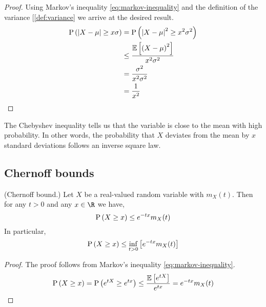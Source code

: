 \documentclass[11pt]{article}
\newcommand{\boxref}[1]{[\ref{#1}}
\begin{document}
\begin{proof}
    Using Markov's inequality \eqref{eq:markov-inequality} and the definition
    of the variance \boxref{def:variance} we arrive at the desired result.
    \begin{align*}
        \operatorname{P}{\left(\left\lvert X - \mu\right\rvert \geq x \sigma\right)}
        & = \operatorname{P}{\left(\left\lvert X - \mu\right\rvert^2 \geq x^2 \sigma^2\right)} \\
        & \leq \frac{\operatorname{\mathbb{E}}{\left[\left(X - \mu\right)^2\right]}}{x^2 \sigma^2} \\
        & = \frac{\sigma^2}{x^2 \sigma^2} \\
        & = \frac{1}{x^2}
    \end{align*}
\end{proof}

\begin{rem}
    The Chebyshev inequality tells us that the variable is close to the mean
    with high probability.
    In other words, the probability that $X$ deviates from the mean by $x$
    standard deviations follows an inverse square law.
\end{rem}

\subsection{Chernoff bounds}

\begin{thm}{(Chernoff bound.)}
    \label{thm:chernoff-bound}
    Let $X$ be a real-valued random variable with \mgf{} $m_X(t)$.
    Then for any $t > 0$ and any $x \in \R$ we have,
    \begin{equation}
        \label{eq:chernoff-bound}
        \P{X \geq x} \leq e^{-tx} m_X(t)
    \end{equation}
    In particular,
    \begin{equation}
        \label{eq:chernoff-bound-inf}
        \P{X \geq x} \leq \inf_{t>0} \bracks{e^{-tx} m_X(t)}
    \end{equation}
\end{thm}

\begin{proof}
    The proof follows from Markov's inequality \eqref{eq:markov-inequality}.
    \begin{align*}
        \operatorname{P}{\left(X \geq x\right)}
        =
        \operatorname{P}{\left(e^{tX} \geq e^{tx}\right)}
        \leq
        \frac{\operatorname{\mathbb{E}}{\left[e^{tX}\right]}}{e^{tx}}
        =
        e^{-tx} m_X(t)
    \end{align*}
\end{proof}
\end{document}
